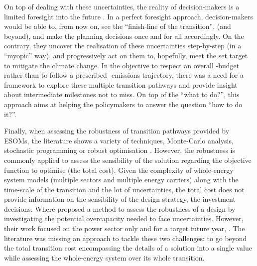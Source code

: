On top of dealing with these uncertainties, the reality of decision-makers is a limited foresight into the future \cite{poncelet2016myopic}. In a perfect foresight approach, decision-makers would be able to, from now on, see the ``finish-line of the transition'',  (and beyond), and make the planning decisions once and for all accordingly. On the contrary, they uncover the realisation of these uncertainties step-by-step (\ie in a ``myopic'' way), and progressively act on them to, hopefully, meet the set target to mitigate the climate change. In the objective to respect an overall -budget rather than to follow a prescribed -emissions trajectory, there was a need for a framework to explore these multiple transition pathways and provide insight about intermediate milestones not to miss. On top of the ``what to do?'', this approach aims at helping the policymakers to answer the  question ``how to do it?''.

Finally, when assessing the robustness of transition pathways provided by \gls{ESOMs}, the literature shows a variety of techniques, \eg Monte-Carlo analysis, stochastic programming or robust optimisation \cite{yue2018review}. However, the robustness is commonly applied to assess the sensibility of the solution regarding the objective function to optimise (\ie the total cost).  Given the complexity of whole-energy system models (\ie multiple sectors and multiple energy carriers) along with the time-scale of the transition and the lot of uncertainties, the total cost does not provide information on the sensibility of the design strategy, \ie the investment decisions. Where \citet{moret2020overcapacity} proposed a method to assess the robustness of a design by investigating the potential overcapacity needed to face uncertainties. However, their work focused on the power sector only and for a target future year, .  The literature was missing an approach to tackle these two challenges: to go beyond the total transition cost encompassing the details of a solution into a single value while assessing the whole-energy system over its whole transition.

